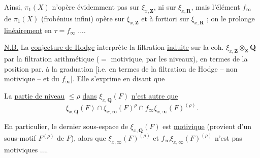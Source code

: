 Ainsi, $\pi_1(X)$ n'opère évidemment pas sur $\xi_{x,\mathbf Z}$, ni  sur $\xi_{x,\mathbf R}$, mais l'élément $f_\infty$ de $\pi_1(X)$ (frobénius infini) opère sur $\xi_{x,\mathbf Z}$ et à fortiori sur $\xi_{x,\mathbf R}$ ; on le prolonge \uline{linéairement} en $\tau=f_\infty$ ....

\uline{N.B.} La \uline{conjecture de Hodge} interprète la filtration \uline{induite} sur la coh.  $\xi_{x,\mathbf Z}\otimes_{\mathbf Z}\mathbf Q$  par la filtration arithmétique ($=$ motivique, par les niveaux), en termes de la position par. à la graduation [i.e. en termes de la filtration de Hodge -- non motivique -- et du $f_\infty$]. Elle s'exprime en disant que


La \uline{partie de niveau} $\leq\rho$ \uline{dans} $\xi_{x,\mathbf Q}(F)$ \uline{n'est autre que}
\[
\xi_{x,\mathbf Q}(F)\cap\xi_{x,\infty}(F)^\rho\cap f_\infty\xi_{x,\infty}(F)^{(\rho)}.
\]

En particulier, le dernier sous-espace de $\xi_{x,\mathbf Q}(F)$ est \uline{motivique} (provient d'un sous-motif $F^{(\rho)}$ de $F$), alors que $\xi_{x,\infty}(F)^{(\rho)}$ et $f_\infty\xi_{x,\infty}(F)^{(\rho)}$ n'est pas motiviques .... 
